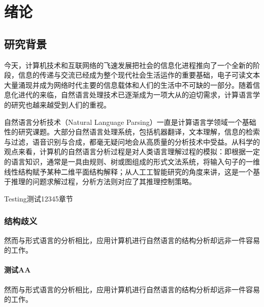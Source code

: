 \chapter{绪论}
\label{chap:introduction}

\section{研究背景}

今天，计算机技术和互联网络的飞速发展把社会的信息化进程推向了一个全新的阶段，信息的传递与交流已经成为整个现代社会生活运作的重要基础，电子可读文本大量涌现并成为网络时代主要的信息载体和人们的生活中不可缺的一部分。随着信息化进代的来临，自然语言处理技术已逐渐成为一项大从的迫切需求，计算语言学的研究也越来越受到人们的重视。

自然语言分析技术（Natural Language Parsing）一直是计算语言学领域一个基础性的研究课题。大部分自然语言处理系统，包括机器翻译，文本理解，信息的检索与过滤，语音识别与合成，都毫无疑问地会从高质量的分析技术中受益。从科学的观点来看，计算机的自然语言分析过程是对人类语言理解过程的模拟：即根据一定的语言知识，通常是一具由规则、树或图组成的形式文法系统，将输入句子的一维线性结构赋予某种二维平面结构解释；从人工工智能研究的角度来讲，这是一个基于推理的问题求解过程，分析方法则对应了其推理控制策略。~\cite{guo_2023_research,thakkar_2018_performance,zheng_2019_nutbaas}

Testing测试12345章节~

\subsection{结构歧义}

然而与形式语言的分析相比，应用计算机进行自然语言的结构分析却远非一件容易的工作。

\subsubsection{测试AA}

然而与形式语言的分析相比，应用计算机进行自然语言的结构分析却远非一件容易的工作。
